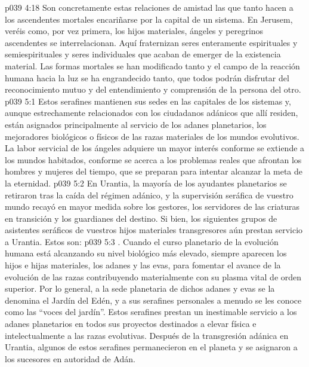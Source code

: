 \vs p039 4:18 Son concretamente estas relaciones de amistad las que tanto hacen a los ascendentes mortales encariñarse por la capital de un sistema. En Jerusem, veréis como, por vez primera, los hijos materiales, ángeles y peregrinos ascendentes se interrelacionan. Aquí fraternizan seres enteramente espirituales y semiespirituales y seres individuales que acaban de emerger de la existencia material. Las formas mortales se han modificado tanto y el campo de la reacción humana hacia la luz se ha engrandecido tanto, que todos podrán disfrutar del reconocimiento mutuo y del entendimiento y comprensión de la persona del otro.
\vs p039 5:1 Estos serafines mantienen sus sedes en las capitales de los sistemas y, aunque estrechamente relacionados con los ciudadanos adánicos que allí residen, están asignados principalmente al servicio de los adanes planetarios, los mejoradores biológicos o físicos de las razas materiales de los mundos evolutivos. La labor servicial de los ángeles adquiere un mayor interés conforme se extiende a los mundos habitados, conforme se acerca a los problemas reales que afrontan los hombres y mujeres del tiempo, que se preparan para intentar alcanzar la meta de la eternidad.
\vs p039 5:2 En Urantia, la mayoría de los ayudantes planetarios se retiraron tras la caída del régimen adánico, y la supervisión seráfica de vuestro mundo recayó en mayor medida sobre los gestores, los servidores de las criaturas en transición y los guardianes del destino. Si bien, los siguientes grupos de asistentes seráficos de vuestros hijos materiales transgresores aún prestan servicio a Urantia. Estos son:
\vs p039 5:3 . Cuando el curso planetario de la evolución humana está alcanzando su nivel biológico más elevado, siempre aparecen los hijos e hijas materiales, los adanes y las evas, para fomentar el avance de la evolución de las razas contribuyendo materialmente con su plasma vital de orden superior. Por lo general, a la sede planetaria de dichos adanes y evas se la denomina el Jardín del Edén, y a sus serafines personales a menudo se les conoce como las “voces del jardín”. Estos serafines prestan un inestimable servicio a los adanes planetarios en todos sus proyectos destinados a elevar física e intelectualmente a las razas evolutivas. Después de la transgresión adánica en Urantia, algunos de estos serafines permanecieron en el planeta y se asignaron a los sucesores en autoridad de Adán.
